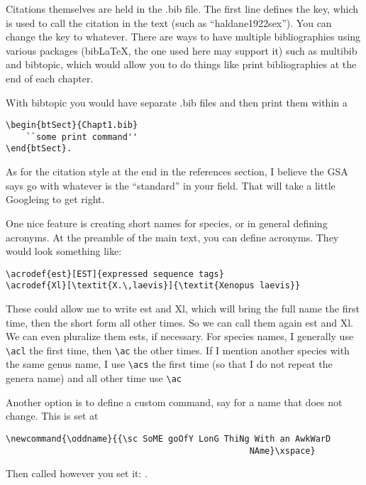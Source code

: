 Citations themselves are held in the .bib file. The first line defines the key, which is used to call the citation in the text (such as ``haldane1922sex''). You can change the key to whatever. There are ways to have multiple bibliographies using various packages (bib\LaTeX{}, the one used here may support it) such as multibib and bibtopic, which would allow you to do things like print bibliographies at the end of each chapter. 

With bibtopic you would have separate .bib files and then print them within a 
\begin{verbatim}
\begin{btSect}{Chapt1.bib}
	``some print command''
\end{btSect}.
\end{verbatim}

As for the citation style at the end in the references section, I believe the GSA says go with whatever is the ``standard'' in your field. That will take a little Googleing to get right. 

\clearpage %

One nice feature is creating short names for species, or in general defining acronyms. At the preamble of the main text, you can define acronyms. They would look something like:
\begin{verbatim}
\acrodef{est}[EST]{expressed sequence tags}
\acrodef{Xl}[\textit{X.\,laevis}]{\textit{Xenopus laevis}}
\end{verbatim}

These could allow me to write \ac{est} and \acl{Xl}, which will bring the full name the first time, then the short form all other times. So we can call them again \ac{est} and \ac{Xl}. We can even pluralize them \acp{est}, if necessary. For species names, I generally use \verb+\acl+ the first time, then \verb+\ac+ the other times. If I mention another species with the same genus name, I use \verb+\acs+ the first time (so that I do not repeat the genera name) and all other time use \verb+\ac+

Another option is to define a custom command, say for a name that does not change. This is set at 
\begin{verbatim}
\newcommand{\oddname}{{\sc SoME goOfY LonG ThiNg With an AwkWarD 
                                                NAme}\xspace}
\end{verbatim}

Then called however you set it: \oddname.

